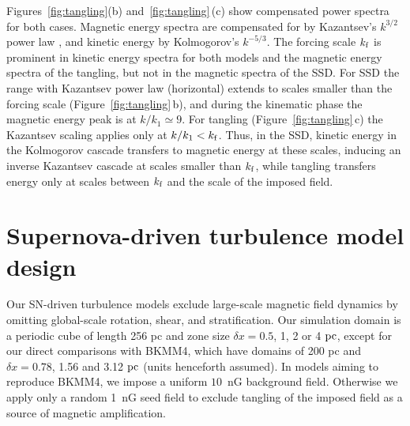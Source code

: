 \documentclass[preprint2]{aastex63}
\newcommand\kf{k_{\rm f} }
\newcommand\pc{~ {\rm pc}}
\newcommand\dx{ {\delta x}}
\newcommand\BKM{{\sf BKMM4}}
\begin{document}
 {Figures~\ref{fig:tangling}(b) and~\ref{fig:tangling}\,(c) show
 compensated power spectra for both cases.}
 Magnetic energy spectra are compensated {for by} Kazantsev's $k^{3/2}$
 {power law} \citep{Sch02,BS14}, and kinetic energy {by} Kolmogorov's
 $k^{-5/3}$.
 The forcing scale $\kf$ is {prominent} in kinetic energy {spectra for
 both models} and the magnetic energy {spectra of the tangling}, but
 {not} {in the magnetic spectra of the SSD}.
 {For SSD the range with Kazantsev power law (horizontal) extends to scales
 smaller than the forcing scale (Figure~\ref{fig:tangling}\,b), and during the
 kinematic phase the magnetic energy peak is at $k/k_1\simeq9$.}
 {For tangling (Figure~\ref{fig:tangling}\,c) the Kazantsev
 {scaling} applies only at $k/k_1<\kf$.} 
 Thus, in the SSD, kinetic energy {in the Kolmogorov cascade} transfers to
 {magnetic energy} 
 at these scales, inducing an inverse Kazantsev {cascade}
 at scales {smaller than} $\kf$, while tangling transfers energy only at
 scales between $\kf$ and the scale of the imposed field.
 
\section{{Supernova-driven} turbulence model design} \label{sec:model}

 {Our} SN-driven turbulence models exclude large-scale magnetic field
 dynamics by {omitting global-scale} rotation, shear, and stratification.
 Our simulation domain is a periodic cube of length 256 pc and zone size
 $\dx=0.5$, 1, 2 or 4$\pc${, except for {our} direct comparisons with
 \BKM, { which have} domains {of} 200 pc and $\dx=0.78$, 1.56 and
 3.12$\pc$ (units henceforth assumed)}.
 {In models aiming to reproduce \BKM, we impose a uniform $10$~nG 
 background field.}
 {Otherwise we apply only a} random 1~nG seed field {to} exclude
 tangling of {the} imposed field {as} a source of magnetic amplification.
\end{document}
